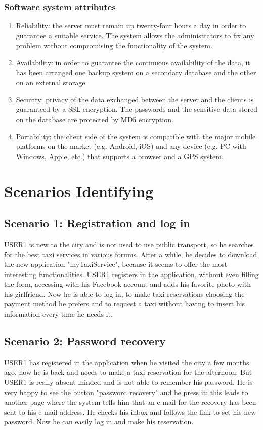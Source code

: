 \documentclass[18pt,oneside,a4paper, titlepage]{article}
\begin{document}
		\subsubsection{Software system attributes} 
			\begin{enumerate}
				\item Reliability: the server must remain up twenty-four hours a day in order to guarantee a suitable service. The system allows the administrators to fix any problem without compromising the functionality of the system.
				\item Availability: in order to guarantee the continuous availability of the data, it has been arranged one backup system on a secondary database and the other on an external storage. 
				\item Security: privacy of the data exchanged between the server and the clients is guaranteed by a SSL encryption. The passwords and the sensitive data stored on the database are protected by MD5 encryption.
				\item Portability: the client side of the system is compatible with the major mobile platforms on the market (e.g. Android, iOS) and any device (e.g. PC with Windows, Apple, etc.) that supports a browser and a GPS system.
			\end{enumerate}
\newpage
\section{Scenarios Identifying}
	\subsection{Scenario 1: Registration and log in}
		USER1 is new to the city and is not used to use public transport, so he searches for the best taxi services in various forums. After a while, he decides to download the new application "myTaxiService", because it seems to offer the most interesting functionalities. USER1 registers in the application, without even filling the form, accessing with his Facebook account and adds his favorite photo with his girlfriend. Now he is able to log in, to make taxi reservations choosing the payment method he prefers and to request a taxi without having to insert his information every time he needs it.
		
	\subsection{Scenario 2: Password recovery}
		USER1 has registered in the application when he visited the city a few months ago, now he is back and needs to make a taxi reservation for the afternoon. But USER1 is really absent-minded and is not able to remember his password. He is very happy to see the button "password recovery" and he press it: this leads to another page where the system tells him that an e-mail for the recovery has been sent to his e-mail address. He checks his inbox and follows the link to set his new password. Now he can easily log in and make his reservation.
		
\end{document}
